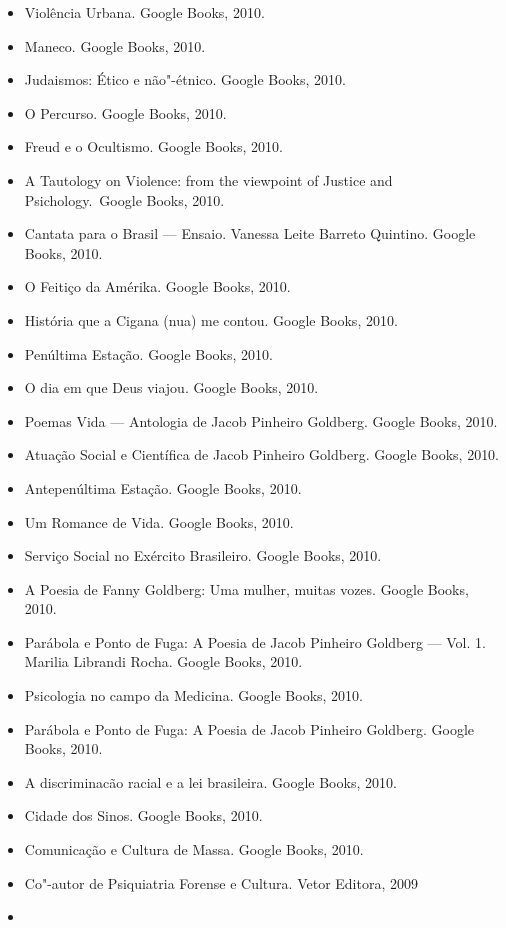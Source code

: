 \begin{itemize}
\item
  Violência Urbana. Google Books, 2010.
\item
  Maneco. Google Books, 2010.
\item
  Judaismos: Ético e não"-étnico. Google Books, 2010.
\item
  O Percurso. Google Books, 2010.
\item
  Freud e o Ocultismo. Google Books, 2010.
\item
  A Tautology on Violence: from the viewpoint of Justice and
  Psichology.~Google Books, 2010.
\item
  Cantata para o Brasil --- Ensaio. Vanessa Leite Barreto Quintino.
  Google Books, 2010.
\item
  O Feitiço da Amérika. Google Books, 2010.
\item
  História que a Cigana (nua) me contou. Google Books, 2010.
\item
  Penúltima Estação. Google Books, 2010.
\item
  O dia em que Deus viajou. Google Books, 2010.
\item
  Poemas Vida --- Antologia de Jacob Pinheiro Goldberg. Google Books,
  2010.
\item
  Atuação Social e Científica de Jacob Pinheiro Goldberg. Google Books,
  2010.
\item
  Antepenúltima Estação. Google Books, 2010.
\item
  Um Romance de Vida. Google Books, 2010.
\item
  Serviço Social no Exército Brasileiro. Google Books, 2010.
\item
  A Poesia de Fanny Goldberg: Uma mulher, muitas vozes. Google Books,
  2010.
\item
  Parábola e Ponto de Fuga: A Poesia de Jacob Pinheiro Goldberg --- Vol.
  1. Marilia Librandi Rocha. Google Books, 2010.
\item
  Psicologia no campo da Medicina. Google Books, 2010.
\item
  Parábola e Ponto de Fuga: A Poesia de Jacob Pinheiro Goldberg. Google
  Books, 2010.
\item
  A discriminacão racial e a lei brasileira. Google Books, 2010.
\item
  Cidade dos Sinos. Google Books, 2010.
\item
  Comunicação e Cultura de Massa. Google Books, 2010.
\item
  Co"-autor de Psiquiatria Forense e Cultura. Vetor Editora, 2009
\item

\end{itemize}
